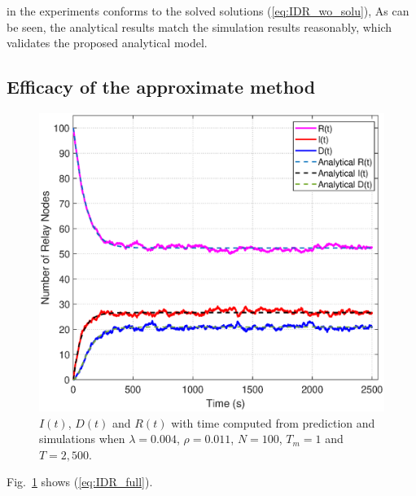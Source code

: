 in the experiments conforms to the solved solutions (\ref{eq:IDR_wo_solu}),
As can be seen, 
the analytical results match
the simulation results reasonably, which validates the proposed
analytical model.
\subsection{Efficacy of the approximate method}
\begin{figure}
  \includegraphics[width=.45\textwidth]{fig/twohop_with_fully_detection.eps}
  \caption{$I(t)$, $D(t)$ and $R(t)$ with time computed from prediction and simulations when $\lambda = 0.004$, $\rho = 0.011$, $N=100$,
  $T_{m} = 1$ and $T=2,500$.}
  \label{fig:twohop_predict_full_d}
\end{figure}
Fig.~\ref{fig:twohop_predict_full_d} shows (\ref{eq:IDR_full}).


